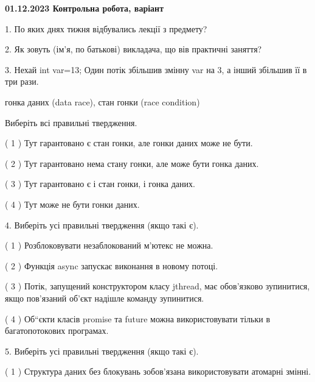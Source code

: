 \documentclass[12pt, ukrainian]{article}
\begin{document}
\vspace{4mm}
\newpage
\begin {large}

\textbf{01.12.2023 Контрольна робота, варіант  }\par


{
1. По яких днях тижня відбувались лекції з предмету?



\vspace{5mm}
2. Як зовуть (ім'я, по батькові) викладача, що вів практичні заняття?



\vspace{5mm}
3. Нехай int var=13; Один потік збільшив змінну var на 3, а інший збільшив її в три рази.

гонка даних (data race), стан гонки (race condition)

Виберіть всі правильні твердження.\par
\vspace{2mm}
( 1 ) Тут гарантовано є стан гонки, але гонки даних може не бути.%

( 2 ) Тут гарантовано нема стану гонки, але може бути гонка даних.%

( 3 ) Тут гарантовано є і стан гонки, і гонка даних.%

( 4 ) Тут може не бути гонки даних.%


\vspace{5mm}
4. Виберіть усі правильні твердження (якщо такі є).\par
\vspace{2mm}

( 1 ) Розблоковувати незаблокований м’ютекс не можна.%

( 2 ) Функція async запускає виконання в новому потоці.%

( 3 ) Потік, запущений конструктором класу jthread, має обов’язково зупинитися, якщо пов’язаний об’єкт надішле команду зупинитися.%

( 4 ) Об“єкти класів promise та future можна використовувати тільки в багатопотокових програмах.%


\vspace{5mm}
5. Виберіть усі правильні твердження (якщо такі є).\par
\vspace{2mm}

( 1 ) Структура даних без блокувань зобов’язана використовувати атомарні змінні.%

}
\end{large}
\end{document}
